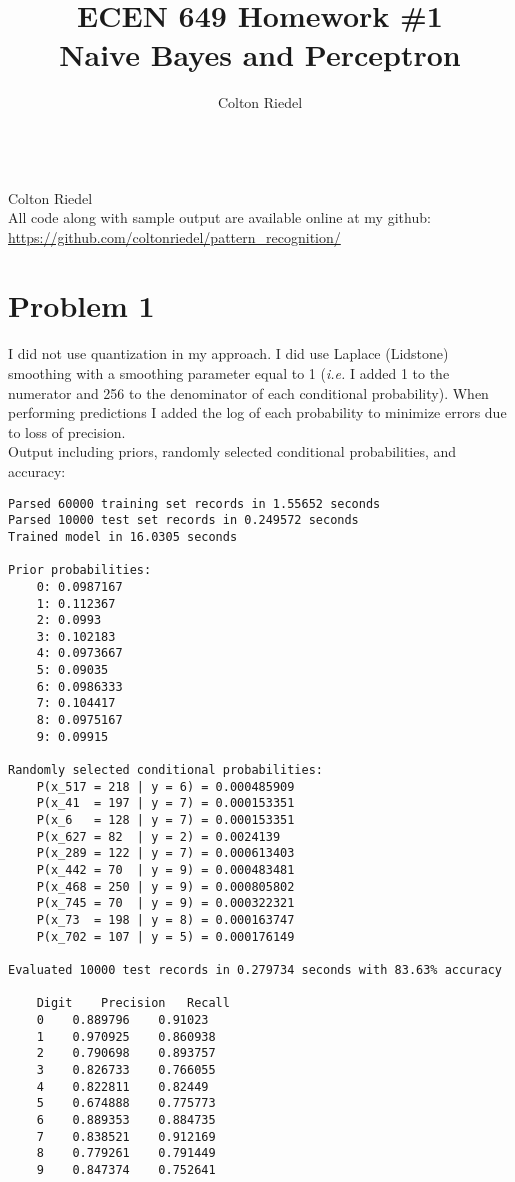 \documentclass[a4paper]{article}
\title{ECEN 649 Homework \#1\\ Naive Bayes and Perceptron}
\author{Colton Riedel}
\begin{document}
{}\\
{\Large Colton Riedel}\\

\noindent All code along with sample output are available online at my github:\\
\url{https://github.com/coltonriedel/pattern_recognition/}

\section*{Problem 1}
I did not use quantization in my approach. I did use Laplace (Lidstone) smoothing with a smoothing parameter equal to 1 ({\it i.e.} I added 1 to the numerator and 256 to the denominator of each conditional probability). When performing predictions I added the log of each probability to minimize errors due to loss of precision.\\

\noindent Output including priors, randomly selected conditional probabilities, and accuracy:\\
\begin{lstlisting}
Parsed 60000 training set records in 1.55652 seconds
Parsed 10000 test set records in 0.249572 seconds
Trained model in 16.0305 seconds

Prior probabilities:
	0: 0.0987167
	1: 0.112367
	2: 0.0993
	3: 0.102183
	4: 0.0973667
	5: 0.09035
	6: 0.0986333
	7: 0.104417
	8: 0.0975167
	9: 0.09915

Randomly selected conditional probabilities:
	P(x_517 = 218 | y = 6) = 0.000485909
	P(x_41  = 197 | y = 7) = 0.000153351
	P(x_6   = 128 | y = 7) = 0.000153351
	P(x_627 = 82  | y = 2) = 0.0024139
	P(x_289 = 122 | y = 7) = 0.000613403
	P(x_442 = 70  | y = 9) = 0.000483481
	P(x_468 = 250 | y = 9) = 0.000805802
	P(x_745 = 70  | y = 9) = 0.000322321
	P(x_73  = 198 | y = 8) = 0.000163747
	P(x_702 = 107 | y = 5) = 0.000176149

Evaluated 10000 test records in 0.279734 seconds with 83.63% accuracy

	Digit	 Precision	 Recall
	0	 0.889796	 0.91023
	1	 0.970925	 0.860938
	2	 0.790698	 0.893757
	3	 0.826733	 0.766055
	4	 0.822811	 0.82449
	5	 0.674888	 0.775773
	6	 0.889353	 0.884735
	7	 0.838521	 0.912169
	8	 0.779261	 0.791449
	9	 0.847374	 0.752641
\end{lstlisting}
\end{document}
